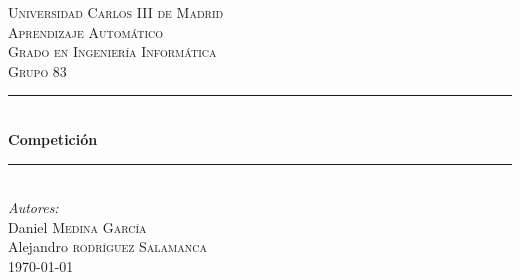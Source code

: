 \documentclass[12pt]{article}
\begin{document}
\begin{titlepage}

\newcommand{\HRule}{\rule{\linewidth}{0.5mm}} %

\center %


\textsc{\LARGE Universidad Carlos III de Madrid}\\[1.2cm] %


\textsc{\Large Aprendizaje Automático}\\[0.5cm] %
\textsc{\large Grado en Ingeniería Informática}\\[0.6cm] %
\textsc{\large Grupo 83}\\[0.5cm]


\HRule \\[0.7cm]
{ \huge \bfseries Competición}\\[0.4cm] %
\HRule \\[0.7cm]


\textit{Autores:}\\
Daniel \textsc{Medina García}\\ %
Alejandro \textsc{rodríguez Salamanca}\\[1.1cm] %


{\large \today}\\ %


\vfill %

\end{titlepage}
\end{document}

